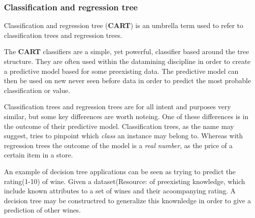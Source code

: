 \subsubsection{Classification and regression tree}
	Classification and regression tree (\textbf{CART}) is an umbrella term used to refer to
	classification trees and regression trees.\cite{trees:umbrella}

	\bigskip\noindent The \textbf{CART} classifiers are a simple, yet powerful, classifier based around the tree structure. 
	They are often used within the datamining discipline in order to create a predictive model based for some preexisting data.
	The predictive model can then be used on new never seen before data in order to predict the most probable classification or value. 
	
	\bigskip\noindent Classification trees and regression trees are for all intent and purposes very similar, but some key differences are worth noteing. 
	One of these differences is in the outcome of their predictive model. 
	Classification trees, as the name may suggest, tries to pinpoint which \textit{class} an instance may belong to. 
	Whereas with regression trees the outcome of the model is a \textit{real number}, as the price of a certain item in a store. 
	
	\bigskip\noindent
	An example of decision tree applications can be seen as trying to predict the rating(1-10) of wine. 
	Given a dataset(Resource: \cite{mining:datasetexample} of preexisting knowledge, which include known attributes to a set of wines and their acoompanying rating.
	A decision tree may be constructred to generalize this knownledge in order to give a prediction of other wines. 	
		
